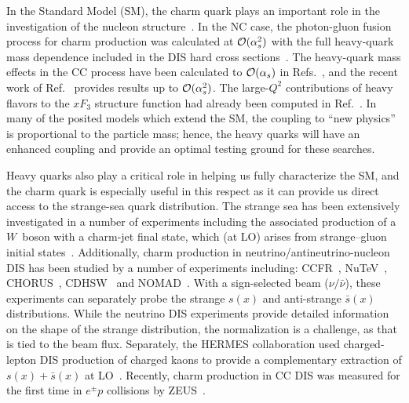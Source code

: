 \documentclass[pdftex,twocolumn,epjc3]{svjour3}          %
\begin{document}
In the Standard Model (SM), the charm quark plays an important role in
the investigation of the nucleon
structure~\cite{Behnke:2015qja,Zenaiev:2016kfl,Abdolmaleki:2017wlg,Abdolmaleki:2019tbb}.
%
In the NC case, the photon-gluon fusion process for charm production
was calculated at ${\cal O}(\alpha_s^2)$ with the full
heavy-quark mass dependence included in the DIS hard cross
sections~\cite{Laenen:1992zk,Laenen:1992xs}.
%
The heavy-quark mass effects in the CC process have been calculated to
${\cal O}(\alpha_s)$ in
Refs.~\cite{Gottschalk:1980rv,Gluck:1997sj,Blumlein:2011zu,Buza:1997mg,Blumlein:2014fqa},
and the recent work of Ref.~\cite{Berger:2016inr} provides results up
to ${\cal O}(\alpha_s^2)$. The large-$Q^2$ contributions of heavy flavors to the
$xF_3$ structure function had already been computed in
Ref.~\cite{Behring:2015roa}.
%
In many of the posited models which extend the SM, the coupling to
``new physics'' is proportional to the particle mass; hence, the heavy
quarks will have an enhanced coupling and provide an optimal testing
ground for these searches.

Heavy quarks also play a critical role in helping us fully
characterize the SM, and the charm quark is especially useful in this
respect as it can provide us direct access to the strange-sea quark
distribution.
%
The strange sea has been extensively investigated in a number of
experiments including  the associated production of a $W$~boson
with a charm-jet final state, which (at LO)
arises from strange--gluon initial states~\cite{Aaltonen:2007dm,Abazov:2008qz,Abazov:2014fka,Chatrchyan:2013uja,Aad:2014xca,Sirunyan:2018hde,AbdulKhalek:2019mps,Kramer:1995yp}.
%
Additionally, charm production in neutrino/antineutrino-nucleon DIS
has been studied by a number of experiments including:
%
CCFR~\cite{Seligman:1997mc},
NuTeV~\cite{Tzanov:2005kr},
CHORUS~\cite{Onengut:2005kv},
CDHSW~\cite{Berge:1989hr}
and
NOMAD~\cite{Samoylov:2013xoa}.
%
With a sign-selected beam ($\nu/\bar{\nu}$), these experiments can
separately probe the strange $s(x)$ and anti-strange $\bar{s}(x)$
distributions. While the neutrino DIS experiments provide
detailed information on the shape of the strange distribution, the
normalization is a challenge, as that is tied to the beam flux.
%
Separately, the HERMES collaboration used charged-lepton DIS
production of charged kaons to provide a complementary extraction of
$s(x)+ \bar{s}(x)$ at LO~\cite{Airapetian:2008qf}.
%
Recently, charm production in CC DIS was measured for the first time in $e^{\pm}p$ collisions by ZEUS~\cite{Abt:2019ngj}.
\end{document}
